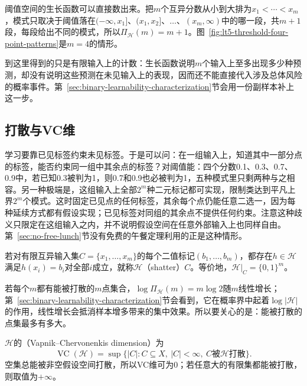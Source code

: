 阈值空间的生长函数可以直接数出来。把$m$个互异分数从小到大排为$x_1<\cdots<x_m$，模式只取决于阈值落在$(-\infty,x_1]$、$(x_1,x_2]$、$\ldots$、$(x_m,\infty)$中的哪一段，共$m+1$段，每段给出不同的模式，所以$\Pi_{\mathcal H}(m)=m+1$。图~\ref{fig:lt5-threshold-four-point-patterns}是$m=4$的情形。

到这里得到的只是有限输入上的计数：生长函数说明$m$个输入上至多出现多少种预测，却没有说明这些预测在未见输入上的表现，因而还不能直接代入涉及总体风险的概率事件。第~\ref{sec:binary-learnability-characterization}节会用一份副样本补上这一步。

\subsection{打散与VC维}
\label{sec:binary-shattering-vc}
\label{sec:comb-vc-growth}
\label{sec:comb-binary-shattering-counts}

学习要靠已见标签约束未见标签。于是可以问：在一组输入上，知道其中一部分点的标签，能否约束同一组中其余点的标签？对阈值能：四个分数0.1、0.3、0.7、0.9中，若已知0.3被判为1，则0.7和0.9也必被判为1，五种模式里只剩两种与之相容。另一种极端是，这组输入上全部$2^m$种二元标记都可实现，限制类达到平凡上界$2^m$个模式。这时固定已见点的任何标签，其余每个点仍能任意二选一，因为每种延续方式都有假设实现；已见标签对同组的其余点不提供任何约束。注意这种歧义只限定在这组输入之内，并不说明假设空间在任意外部输入上也同样自由。第~\ref{sec:no-free-lunch}节没有免费的午餐定理利用的正是这种情形。

\begin{definition}[打散]
\label{def:shattering}
若对有限互异输入集$C=\{x_1,\ldots,x_m\}$的每个二值标记$(b_1,\ldots,b_m)$，都存在$h\in\mathcal H$满足$h(x_i)=b_i$对全部$i$成立，就称$\mathcal H$（shatter）$C$。等价地，$\mathcal H|_C=\{0,1\}^m$。
\end{definition}

若每个$m$都有能被打散的$m$点集合，$\log\Pi_{\mathcal H}(m)=m\log2$随$m$线性增长；第~\ref{sec:binary-learnability-characterization}节会看到，它在概率界中起着$\log|\mathcal H|$的作用，线性增长会抵消样本增多带来的集中效果。所以要关心的是：能被打散的点集最多有多大。

\begin{definition}[VC维]
\label{def:vc-dimension}
$\mathcal H$的（Vapnik--Chervonenkis dimension）为
\[
 \operatorname{VC}(\mathcal H)
 =\sup\{|C|:C\subseteq X,\ |C|<\infty,\ C\text{被}\mathcal H\text{打散}\}.
\]
空集总能被非空假设空间打散，所以VC维可为$0$；若任意大的有限集都能被打散，则取值为$+\infty$。
\end{definition}

